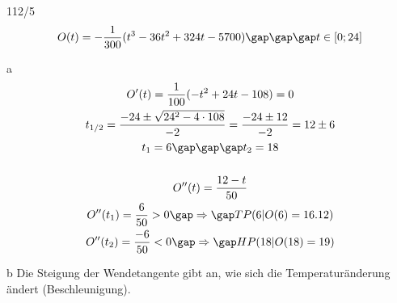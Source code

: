 \begin{exercise}{112/5}
  $$O(t) = -\frac{1}{300}(t^3 - 36t^2 + 324t - 5700) \gap\gap\gap t \in \left[0; 24\right]$$
  \item [a]
  \begin{gather*}
    O'(t) = \frac{1}{100}(-t^2 + 24t - 108) = 0 \\
    t_{1/2} = \frac{-24 \pm \sqrt{24^2 - 4 \cdot 108}}{-2} = \frac{-24 \pm 12}{-2} = 12 \pm 6 \\
    t_1 = 6 \gap\gap\gap t_2 = 18 \\\\
    O''(t) = \frac{12 - t}{50} \\
    O''(t_1) = \frac{6}{50} > 0 \gap\Rightarrow\gap TP(6|O(6) = 16.12) \\
    O''(t_2) = \frac{-6}{50} < 0 \gap\Rightarrow\gap HP(18|O(18) = 19)
  \end{gather*}
  \item [b]
  Die Steigung der Wendetangente gibt an, wie sich die Temperaturänderung ändert (Beschleunigung).
\end{exercise}

